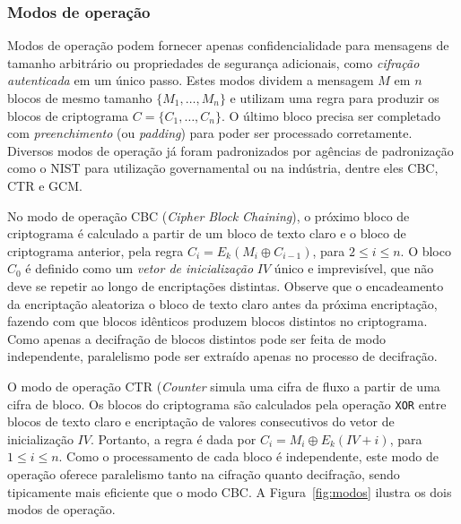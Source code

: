 \subsubsection*{Modos de operação}

Modos de operação podem fornecer apenas confidencialidade para mensagens de tamanho arbitrário ou propriedades de segurança adicionais, como \emph{cifração autenticada} em um único passo. Estes modos dividem a mensagem $M$ em $n$ blocos de mesmo tamanho $\{M_1, \ldots, M_n\}$ e utilizam uma regra para produzir os blocos de criptograma $C = \{C_1, \ldots, C_n\}$.
O último bloco precisa ser completado com \emph{preenchimento} (ou \emph{padding}) para poder ser processado corretamente.
Diversos modos de operação já foram padronizados por agências de padronização como o NIST para utilização governamental ou na indústria, dentre eles CBC, CTR e GCM.

No modo de operação CBC (\emph{Cipher Block Chaining}), o próximo bloco de criptograma é calculado a partir de um bloco de texto claro e o bloco de criptograma anterior, pela regra $C_i = E_k(M_i \oplus C_{i-1})$, para $2 \leq i \leq n$. O bloco $C_0$ é definido como um \emph{vetor de inicialização} $IV$ único e imprevisível, que não deve se repetir ao longo de encriptações distintas. Observe que o encadeamento da encriptação aleatoriza o bloco de texto claro antes da próxima encriptação, fazendo com que blocos idênticos produzem blocos distintos no criptograma. Como apenas a decifração de blocos distintos pode ser feita de modo independente, paralelismo pode ser extraído apenas no processo de decifração.

O modo de operação CTR (\emph{Counter} simula uma cifra de fluxo a partir de uma cifra de bloco. Os blocos do criptograma são calculados pela operação \texttt{XOR} entre blocos de texto claro e encriptação de valores consecutivos do vetor de inicialização $IV$. Portanto, a regra é dada por $C_i = M_i \oplus E_k(IV + i)$, para $1 \leq i \leq n$. Como o processamento de cada bloco é independente, este modo de operação oferece paralelismo tanto na cifração quanto decifração, sendo tipicamente mais eficiente que o modo CBC. A Figura~\ref{fig:modos} ilustra os dois modos de operação.

